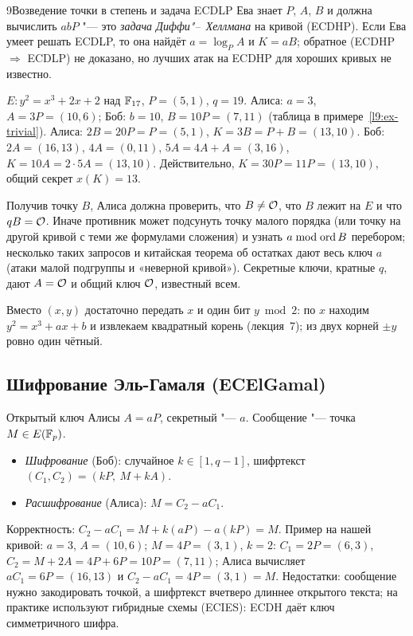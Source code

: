 \begin{lecture}{9}{Возведение точки в степень и задача ECDLP}
Ева знает $P$, $A$, $B$ и должна вычислить $abP$ "--- это \emph{задача Диффи"--~Хеллмана} на
кривой (ECDHP). Если Ева умеет решать ECDLP, то она найдёт $a = \log_P A$ и $K = aB$; обратное
(ECDHP $\Rightarrow$ ECDLP) не доказано, но лучших атак на ECDHP для хороших кривых не известно.

\begin{example}\label{l9:ex-ecdh}
$E\colon y^2 = x^3 + 2x + 2$ над $\mathbb{F}_{17}$, $P = (5, 1)$, $q = 19$. Алиса: $a = 3$,
$A = 3P = (10, 6)$; Боб: $b = 10$, $B = 10P = (7, 11)$ (таблица в
примере~\ref{l9:ex-trivial}). Алиса: $2B = 20P = P = (5, 1)$, $K = 3B = P + B = (13, 10)$.
Боб: $2A = (16, 13)$, $4A = (0, 11)$, $5A = 4A + A = (3, 16)$, $K = 10A = 2 \cdot 5A = (13, 10)$.
Действительно, $K = 30P = 11P = (13, 10)$, общий секрет $x(K) = 13$.
\end{example}


\begin{remark}
Получив точку $B$, Алиса должна проверить, что $B \ne \mathcal{O}$, что $B$ лежит на $E$ и что
$qB = \mathcal{O}$. Иначе противник может подсунуть точку малого порядка (или точку на другой кривой
с теми же формулами сложения) и узнать $a \bmod \operatorname{ord} B$ перебором; несколько таких запросов
и китайская теорема об остатках дают весь ключ $a$ (атаки малой подгруппы и «неверной кривой»).
Секретные ключи, кратные $q$, дают $A = \mathcal{O}$ и общий ключ $\mathcal{O}$, известный всем.
\end{remark}

\begin{remark}
Вместо $(x, y)$ достаточно передать $x$ и один бит $y \bmod 2$: по $x$ находим
$y^2 = x^3 + ax + b$ и извлекаем квадратный корень (лекция~7); из двух корней $\pm y$ ровно один
чётный.
\end{remark}

\subsection{Шифрование Эль-Гамаля (ECElGamal)}

Открытый ключ Алисы $A = aP$, секретный "--- $a$. Сообщение "--- точка $M \in E(\mathbb{F}_p)$.
\begin{itemize}
  \item \emph{Шифрование} (Боб): случайное $k \in [1, q - 1]$, шифртекст
    $(C_1, C_2) = (kP,\ M + kA)$.
  \item \emph{Расшифрование} (Алиса): $M = C_2 - aC_1$.
\end{itemize}
Корректность: $C_2 - aC_1 = M + k(aP) - a(kP) = M$. Пример на нашей кривой: $a = 3$,
$A = (10, 6)$; $M = 4P = (3, 1)$, $k = 2$: $C_1 = 2P = (6, 3)$, $C_2 = M + 2A = 4P + 6P = 10P =
(7, 11)$; Алиса вычисляет $aC_1 = 6P = (16, 13)$ и $C_2 - aC_1 = 4P = (3, 1) = M$. Недостатки:
сообщение нужно закодировать точкой, а шифртекст вчетверо длиннее открытого текста; на
практике используют гибридные схемы (ECIES): ECDH даёт ключ симметричного шифра.


\end{lecture}
